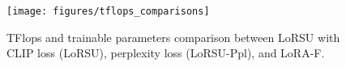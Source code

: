 \begin{figure}
\vskip 0.2in
\centering
\texttt{[image: figures/tflops\_comparisons]}
\caption{TFlops and trainable parameters comparison between LoRSU with CLIP loss (LoRSU), perplexity loss (LoRSU-Ppl), and LoRA-F.}%
\label{fig:tflops_comparisons}
\vskip -0.2in
\end{figure}